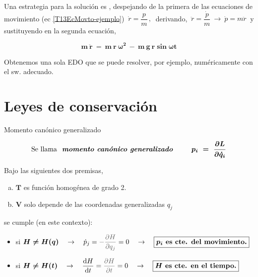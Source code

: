 Una estrategia para la solución es , despejando de la primera de las ecuaciones de movimiento (ec \ref{T13EcMovto-ejemplo}) $ \ \dot r =  \dfrac p m \, , \ $ derivando, $ \ \ddot r =  \dfrac {\dot p} {m} \ \to \ \dot p = m \ddot r \ $ y sustituyendo en la segunda ecuación,

\begin{equation}
\boldsymbol{m \ \ddot r \ = \ m \ r \ \omega^2 \ - \ m\ g\ r \sin \omega t}
\end{equation}

Obtenemos una sola EDO que se puede resolver, por ejemplo, numéricamente con el sw. adecuado.

\vspace{1cm}
\section{Leyes de conservación}
\vspace{0.5cm}

\begin{definition}

\begin{myblock}{Momento canónico generalizado}
\begin{large}
\begin{equation}
\label{T13MomentoCanonicoGeneralizado}	
\text{Se llama } \textbf{ \emph{momento canónico generalizado} } \qquad  \boldsymbol{ p_i \ = \ \pdv{L}{\dot q_i} }
\end{equation}
\end{large}
\end{myblock}	
\end{definition}

\vspace{5mm}
Bajo las siguientes dos premisas,

\begin{enumerate}[a) ]
\item $\boldsymbol T$ es función homogénea de grado 2.
\item $\boldsymbol V$ solo depende de las coordenadas generalizadas $q_j$	
\end{enumerate}

se cumple (en este contexto):

\begin{itemize}
\item si $\boldsymbol{ H \neq H(q) } \quad \to \quad \dot p_j =\textcolor{gris}{-\displaystyle \pdv{H}{q_j}} = 0 \quad \to \quad \boxed{ \boldsymbol {p_i} \textbf{ es cte. del movimiento.}}$	
\item si $\boldsymbol{ H \neq H(t) } \quad \to \quad \displaystyle \dv{H}{t} =\textcolor{gris}{\pdv{H}{t}} = 0 \quad \to \quad \boxed{ \boldsymbol {H} \textbf{ es cte. en el tiempo.}}$	
\end{itemize}

